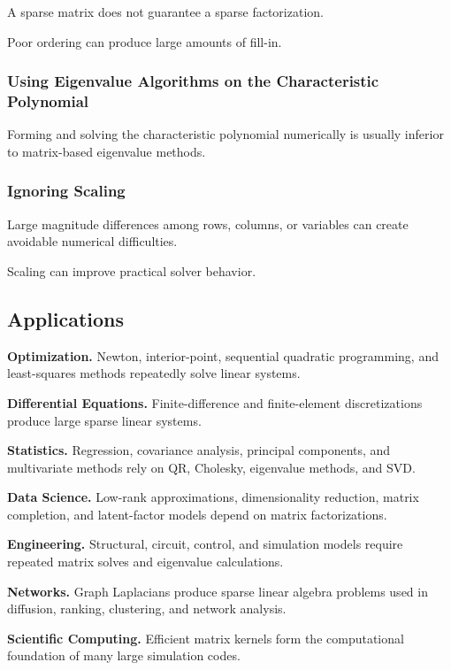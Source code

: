 A sparse matrix does not guarantee a sparse factorization.

Poor ordering can produce large amounts of fill-in.

\subsubsection{Using Eigenvalue Algorithms on the Characteristic Polynomial}

Forming and solving the characteristic polynomial numerically is usually
inferior to matrix-based eigenvalue methods.

\subsubsection{Ignoring Scaling}

Large magnitude differences among rows, columns, or variables can create
avoidable numerical difficulties.

Scaling can improve practical solver behavior.

\subsection{Applications}
\label{subsec:nla-applications}

\begin{applicationbox}

\textbf{Optimization.}
Newton, interior-point, sequential quadratic programming, and least-squares
methods repeatedly solve linear systems.

\medskip

\textbf{Differential Equations.}
Finite-difference and finite-element discretizations produce large sparse
linear systems.

\medskip

\textbf{Statistics.}
Regression, covariance analysis, principal components, and multivariate
methods rely on QR, Cholesky, eigenvalue methods, and SVD.

\medskip

\textbf{Data Science.}
Low-rank approximations, dimensionality reduction, matrix completion, and
latent-factor models depend on matrix factorizations.

\medskip

\textbf{Engineering.}
Structural, circuit, control, and simulation models require repeated matrix
solves and eigenvalue calculations.

\medskip

\textbf{Networks.}
Graph Laplacians produce sparse linear algebra problems used in diffusion,
ranking, clustering, and network analysis.

\medskip

\textbf{Scientific Computing.}
Efficient matrix kernels form the computational foundation of many large
simulation codes.

\end{applicationbox}

